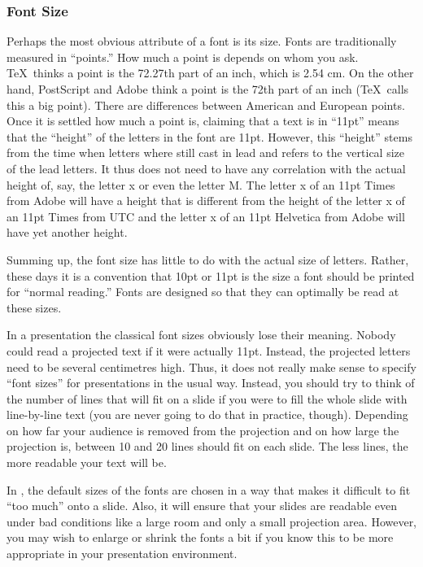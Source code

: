 \subsubsection{Font Size}
\label{section-sizes}

Perhaps the most obvious attribute of a font is its size. Fonts are traditionally measured in ``points.'' How much a point is depends on whom you ask. \TeX\ thinks a point is the 72.27th part of an inch, which is 2.54 cm. On the other hand, PostScript and Adobe think a point is the 72th part of an inch (\TeX\ calls this a big point). There are differences between American and European points. Once it is settled how much a point is, claiming that a text is in ``11pt'' means that the ``height'' of the letters in the font are 11pt. However, this ``height'' stems from the time when letters where still cast in lead and refers to the vertical size of the lead letters. It thus does not need to have any correlation with the actual height of, say, the letter x or even the letter M. The letter x of an 11pt Times from Adobe will have a height that is different from the height of the letter x of an 11pt Times from UTC and the letter x of an 11pt Helvetica from Adobe will have yet another height.

Summing up, the font size has little to do with the actual size of letters. Rather, these days it is a convention that 10pt or 11pt is the size a font should be printed for ``normal reading.'' Fonts are designed so that they can optimally be read at these sizes.

In a presentation the classical font sizes obviously lose their meaning. Nobody could read a projected text if it were actually 11pt. Instead, the projected letters need to be several centimetres high. Thus, it does not really make sense to specify ``font sizes'' for presentations in the usual way. Instead, you should try to think of the number of lines that will fit on a slide if you were to fill the whole slide with line-by-line text (you are never going to do that in practice, though). Depending on how far your audience is removed from the projection and on how large the projection is, between 10 and 20 lines should fit on each slide. The less lines, the more readable your text will be.

In \beamer, the default sizes of the fonts are chosen in a way that makes it difficult to fit ``too much'' onto a slide. Also, it will ensure that your slides are readable even under bad conditions like a large room and only a small projection area. However, you may wish to enlarge or shrink the fonts a bit if you know this to be more appropriate in your presentation environment.

